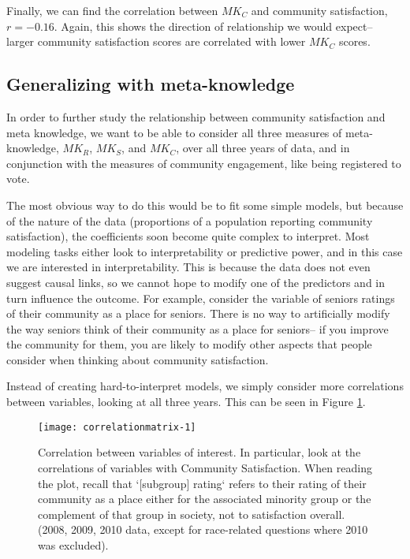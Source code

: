 \documentclass[smallextended]{svjour3}\usepackage[]{graphicx}\usepackage[]{color}
\newenvironment{knitrout}{}{} %
\begin{document}
Finally, we can find the correlation between $MK_C$ and community satisfaction, $r= $\ensuremath{-0.16}. Again, this shows the direction of relationship we would expect-- larger community satisfaction scores are correlated with lower $MK_C$ scores. 

\subsection{Generalizing with meta-knowledge}
In order to further study the relationship between community satisfaction and meta knowledge, we want to be able to consider all three measures of meta-knowledge, $MK_R$, $MK_S$, and  $MK_C$, over all three years of data, and in conjunction with the measures of community engagement, like being registered to vote. 

The most obvious way to do this would be to fit some simple models, but because of the nature of the data (proportions of a population reporting community satisfaction), the coefficients soon become quite complex to interpret. Most modeling tasks either look to interpretability or predictive power, and in this case we are interested in interpretability. This is because the data does not even suggest causal links, so we cannot hope to modify one of the predictors and in turn influence the outcome. For example, consider the variable of seniors ratings of their community as a place for seniors. There is no way to artificially modify the way seniors think of their community as a place for seniors-- if you improve the community for them, you are likely to modify other aspects that people consider when thinking about community satisfaction. 

Instead of creating hard-to-interpret models, we simply consider more correlations between variables, looking at all three years. This can be seen in Figure \ref{fig:correlationmatrix}. 

\begin{knitrout}
\color{fgcolor}\begin{figure}

{\centering \texttt{[image: correlationmatrix-1]} 

}

\caption[Correlation between variables of interest]{Correlation between variables of interest. In particular, look at the correlations of variables with Community Satisfaction. When reading the plot, recall that `[subgroup] rating` refers to their rating of their community as a place either for the associated minority group or the complement of that group in society, not to satisfaction overall. (2008, 2009, 2010 data, except for race-related questions where 2010 was excluded).}\label{fig:correlationmatrix}
\end{figure}


\end{knitrout}
\end{document}
